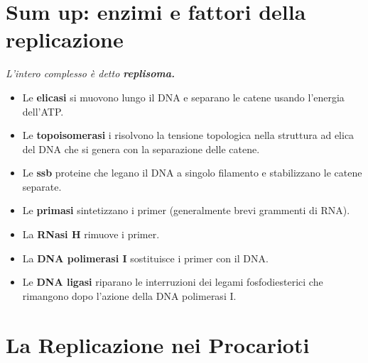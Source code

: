 \documentclass{article}
\begin{document}
\section{Sum up: enzimi e fattori della replicazione}
\begin{center}
    \textit{L'intero complesso è detto \textbf{replisoma.}}
\end{center}
\begin{itemize}
    \item [] Le \textbf{elicasi} si muovono lungo il DNA e separano le catene usando l'energia dell'ATP.
    \item [] Le \textbf{topoisomerasi} i risolvono la tensione topologica nella struttura ad elica del DNA che si genera con la separazione delle catene.
    \item [] Le \textbf{ssb} proteine che legano il DNA a singolo filamento e stabilizzano le catene separate.
    \item [] Le \textbf{primasi} sintetizzano i primer (generalmente brevi grammenti di RNA).
    \item [] La \textbf{RNasi H} rimuove i primer.
    \item [] La \textbf{DNA polimerasi I} sostituisce i primer con il DNA.
    \item [] Le \textbf{DNA ligasi} riparano le interruzioni dei legami fosfodiesterici che rimangono dopo l'azione della DNA polimerasi I.
\end{itemize}
\section{La Replicazione nei Procarioti} 
\end{document}
